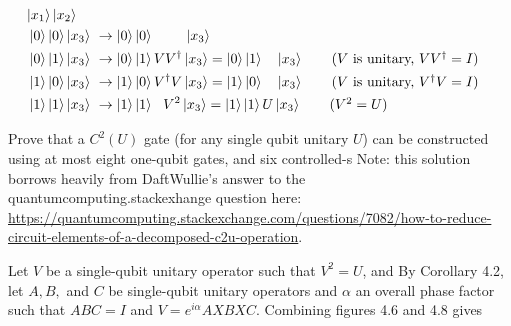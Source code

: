 \begin{align*}
\ket{x_1}\ket{x_2}\ \ \ \ \\
\ket{0}\ket{0}\ket{x_3}\ &\rightarrow \ket{0}\ket{0}\ \ \ \ \ \ \ \ket{x_3} \\
\ket{0}\ket{1}\ket{x_3}\ &\rightarrow\ket{0}\ket{1}VV^\dagger\ket{x_3} =\ket{0}\ket{1}\ \ \ \ket{x_3} \tag{$V$ is unitary, $VV^\dagger=I$}\\
\ket{1}\ket{0}\ket{x_3}\ &\rightarrow\ket{1}\ket{0} V^\dagger V\ket{x_3} = \ket{1}\ket{0}\ \ \ \ket{x_3} \tag{$V$ is unitary, $V^\dagger V=I$}\\
\ket{1}\ket{1}\ket{x_3}\ &\rightarrow \ket{1}\ket{1}\ \ V^2\ket{x_3}=\ket{1}\ket{1} U\ket{x_3} \tag{$   V^2=U$}
\end{align*}

 Prove that a $C^2(U)$ gate (for any single qubit unitary $U$) can be constructed using at most eight one-qubit gates, and six controlled-\NOT s
\Soln Note: this solution borrows heavily from  DaftWullie's answer to the quantumcomputing.stackexhange question here: \href{_}\url{https://quantumcomputing.stackexchange.com/questions/7082/how-to-reduce-circuit-elements-of-a-decomposed-c2u-operation}.

 Let $V$ be a single-qubit unitary operator such that $V^2=U$, and By Corollary 4.2, let $A,B,$ and $C$ be single-qubit unitary operators and $\alpha$ an overall phase factor such that $ABC=I$ and $V=e^{i\alpha}AXBXC$. Combining figures 4.6 and 4.8 gives

